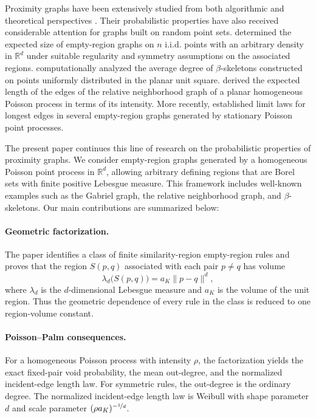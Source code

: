 \documentclass[a4paper,fleqn]{cas-dc}
\numberwithin{equation}{section}
\newcommand{\1}{\mathds{1}}
\newcommand{\0}{\mathbf{0}}
\begin{document}
Proximity graphs have been extensively studied from both algorithmic and theoretical perspectives \citep{cimikowski1990coloring,hurtado2003optimal,cardinal2009empty,bose2012proximity,kowaluk2015new}. Their probabilistic properties have also received considerable attention for graphs built on random point sets. \citet{devroye1988expected} determined the expected size of empty-region graphs on $n$ i.i.d. points with an arbitrary density in $\mathds{R}^d$ under suitable regularity and symmetry assumptions on the associated regions. \citet{alonso2019geometrical} computationally analyzed the average degree of $\beta$-skeletons constructed on points uniformly distributed in the planar unit square. \citet{watanabe2008evaluating} derived the expected length of the edges of the relative neighborhood graph of a planar homogeneous Poisson process in terms of its intensity. More recently, \citet{sambale2026limit} established limit laws for longest edges in several empty-region graphs generated by stationary Poisson point processes.

The present paper continues this line of research on the probabilistic properties of proximity graphs. We consider empty-region graphs generated by a homogeneous Poisson point process in $\mathds{R}^d$, allowing arbitrary defining regions that are Borel sets with finite positive Lebesgue measure. This framework includes well-known examples such as the Gabriel graph, the relative neighborhood graph, and $\beta$-skeletons. Our main contributions are summarized below:

\paragraph{Geometric factorization.}
The paper identifies a class of finite similarity-region empty-region rules and proves that the region $S(p,q)$ associated with each pair $p \neq q$ has volume
\begin{equation}
\lambda_d\bigl(S(p,q)\bigr) = a_K\|p-q \|^d,
\end{equation}
where $\lambda_d$ is the $d$-dimensional Lebesgue measure and $a_K$
is the volume of the unit region. Thus the geometric dependence of every rule in the class is reduced to one region-volume constant. 

\paragraph{Poisson--Palm consequences.}
For a homogeneous Poisson process with intensity \(\rho\), the
factorization yields the exact fixed-pair void probability, the mean
out-degree, and the normalized incident-edge length law. For symmetric
rules, the out-degree is the ordinary degree. The normalized
incident-edge length law is Weibull with shape parameter \(d\) and
scale parameter \((\rho a_K)^{-\nicefrac{1}{d}}\).
\end{document}
